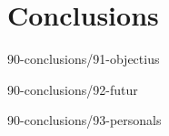 \chapter{Conclusions}

{90-conclusions/91-objectius}

{90-conclusions/92-futur}

{90-conclusions/93-personals}



